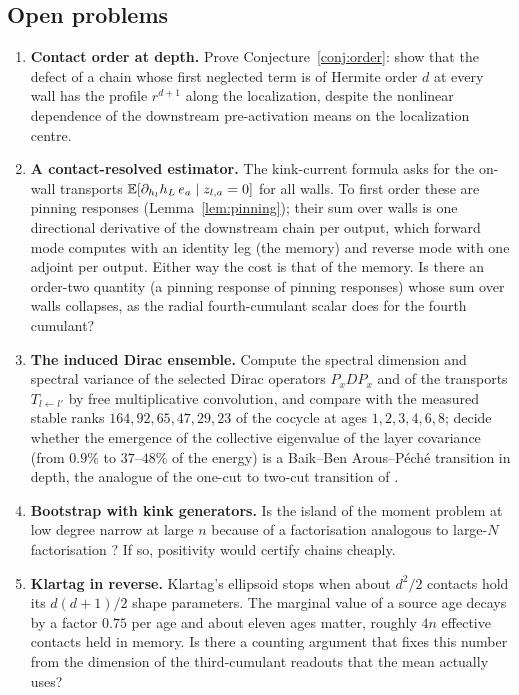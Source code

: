 \subsection{Open problems}
\begin{enumerate}[leftmargin=*]
\item \textbf{Contact order at depth.} Prove Conjecture~\ref{conj:order}: show that the defect of a chain whose first
neglected term is of Hermite order $d$ at every wall has the profile $r^{d+1}$ along the localization, despite the
nonlinear dependence of the downstream pre-activation means on the localization centre.
\item \textbf{A contact-resolved estimator.} The kink-current formula asks for the on-wall transports
$\mathbb E[\partial_{h_l}h_L\,e_a\mid z_{l,a}=0]$ for all walls. To first order these are pinning responses
(Lemma~\ref{lem:pinning}); their sum over walls is one directional derivative of the downstream chain per output,
which forward mode computes with an identity leg (the memory) and reverse mode with one adjoint per output. Either way
the cost is that of the memory. Is there an order-two quantity (a pinning response of pinning responses) whose sum
over walls collapses, as the radial fourth-cumulant scalar does for the fourth cumulant?
\item \textbf{The induced Dirac ensemble.} Compute the spectral dimension and spectral variance \cite{BDG} of the
selected Dirac operators $P_xDP_x$ and of the transports $T_{l\leftarrow l'}$ by free multiplicative convolution, and
compare with the measured stable ranks $164,92,65,47,29,23$ of the cocycle at ages $1,2,3,4,6,8$; decide whether the
emergence of the collective eigenvalue of the layer covariance (from $0.9\%$ to $37$--$48\%$ of the energy) is a
Baik--Ben Arous--P\'ech\'e transition in depth, the analogue of the one-cut to two-cut transition of \cite{DG}.
\item \textbf{Bootstrap with kink generators.} Is the island of the moment problem at low degree narrow at large $n$
because of a factorisation analogous to large-$N$ factorisation \cite{KP}? If so, positivity would certify chains
cheaply.
\item \textbf{Klartag in reverse.} Klartag's ellipsoid stops when about $d^2/2$ contacts hold its $d(d+1)/2$ shape
parameters. The marginal value of a source age decays by a factor $0.75$ per age and about eleven ages matter,
roughly $4n$ effective contacts held in memory. Is there a counting argument that fixes this number from the dimension
of the third-cumulant readouts that the mean actually uses?
\end{enumerate}

